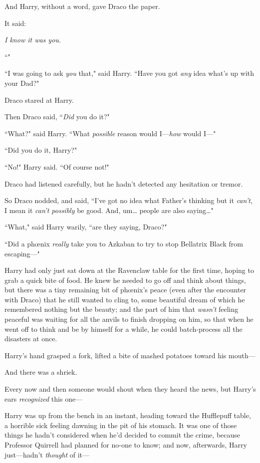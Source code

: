 And Harry, without a word, gave Draco the paper.

It said:

\emph{I know it was you.}

``\emph{}"

``I was going to ask \emph{you} that," said Harry. ``Have you got \emph{any} idea what's up with your Dad?"

Draco stared at Harry.

Then Draco said, ``\emph{Did} you do it?"

``What?" said Harry. ``What \emph{possible} reason would I—\emph{how} would I—"

``Did you do it, Harry?"

``No!" Harry said. ``Of course not!"

Draco had listened carefully, but he hadn't detected any hesitation or tremor.

So Draco nodded, and said, ``I've got no idea what Father's thinking but it \emph{can't}, I mean it \emph{can't possibly} be good. And, um{\ldots} people are also saying{\ldots}"

``What," said Harry warily, ``are they saying, Draco?"

``Did a phœnix \emph{really} take you to Azkaban to try to stop Bellatrix Black from escaping—"


Harry had only just sat down at the Ravenclaw table for the first time, hoping to grab a quick bite of food. He knew he needed to go off and think about things, but there was a tiny remaining bit of phœnix's peace (even after the encounter with Draco) that he still wanted to cling to, some beautiful dream of which he remembered nothing but the beauty; and the part of him that \emph{wasn't} feeling peaceful was waiting for all the anvils to finish dropping on him, so that when he went off to think and be by himself for a while, he could batch-process all the disasters at once.

Harry's hand grasped a fork, lifted a bite of mashed potatoes toward his mouth—

And there was a shriek.

Every now and then someone would shout when they heard the news, but Harry's ears \emph{recognized} this one—

Harry was up from the bench in an instant, heading toward the Hufflepuff table, a horrible sick feeling dawning in the pit of his stomach. It was one of those things he hadn't considered when he'd decided to commit the crime, because Professor Quirrell had planned for no-one to know; and now, afterwards, Harry just—hadn't \emph{thought} of it—

